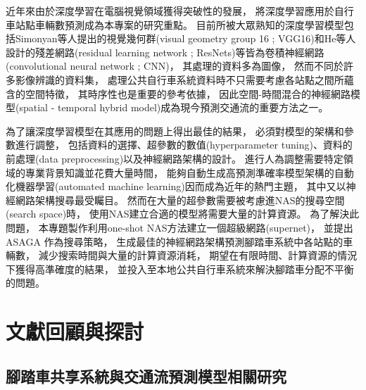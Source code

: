 \documentclass[a4paper,12pt]{extarticle}
\begin{document}
        近年來由於深度學習在電腦視覺領域獲得突破性的發展\cite{8114708}，
        將深度學習應用於自行車站點車輛數預測成為本專案的研究重點。
        目前所被大眾熟知的深度學習模型包括Simonyan等人提出的視覺幾何群(visual geometry group 16 ; VGG16)\cite{simonyan2014very}和He等人設計的殘差網路(residual learning network ; ResNets)\cite{he2016deep}等皆為卷積神經網路(convolutional neural network ; CNN)，
        其處理的資料多為圖像，
        然而不同於許多影像辨識的資料集，
        處理公共自行車系統資料時不只需要考慮各站點之間所蘊含的空間特徵，
        其時序性也是重要的參考依據，
        因此空間-時間混合的神經網路模型(spatial - temporal hybrid model)成為現今預測交通流的重要方法之一。
     
        為了讓深度學習模型在其應用的問題上得出最佳的結果，
        必須對模型的架構和參數進行調整，
        包括資料的選擇、超參數的數值(hyperparameter tuning)\cite{10.5555/2986459.2986743}、資料的前處理(data preprocessing)\cite{kotsiantis2006data}\cite{famili1997data}以及神經網路架構的設計。
        進行人為調整需要特定領域的專業背景知識並花費大量時間，
        能夠自動生成高預測準確率模型架構的自動化機器學習(automated machine learning)\cite{WARING2020101822}因而成為近年的熱門主題，
        其中又以神經網路架構搜尋\cite{elsken2019neural}最受矚目。
        然而在大量的超參數需要被考慮進NAS的搜尋空間(search space)時，
        使用NAS建立合適的模型將需要大量的計算資源\cite{zhao2020simplifying}。
        為了解決此問題，
        本專題製作利用one-shot NAS方法\cite{pmlr-v80-bender18a}建立一個超級網路(supernet)，
        並提出 ASAGA 作為搜尋策略，
        生成最佳的神經網路架構預測腳踏車系統中各站點的車輛數，
        減少搜索時間與大量的計算資源消耗，
        期望在有限時間、計算資源的情況下獲得高準確度的結果，
        並投入至本地公共自行車系統來解決腳踏車分配不平衡的問題。

    \section{文獻回顧與探討}
        \subsection{腳踏車共享系統與交通流預測模型相關研究}
            
\end{document}
